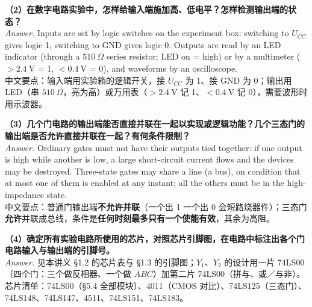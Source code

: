 \documentclass[11pt]{ctexart}
\let\origsubhdr\subhdr
\renewcommand{\subhdr}[1]{\needspace{3\baselineskip}\origsubhdr{#1}}
\begin{document}
\textbf{（2）在数字电路实验中，怎样给输入端施加高、低电平？怎样检测输出端的状态？}\\
\emph{Answer.} Inputs are set by logic switches on the experiment box: switching to $U_{CC}$ gives logic 1, switching to GND gives logic 0. Outputs are read by an LED indicator (through a $510\ \Omega$ series resistor; LED on = high) or by a multimeter ($>2.4\ \mathrm{V}$ = 1, $<0.4\ \mathrm{V}$ = 0), and waveforms by an oscilloscope.\\
中文要点：输入端用实验箱的逻辑开关，接 $U_{CC}$ 为 1、接 GND 为 0；输出用 LED（串 $510\ \Omega$，亮为高）或万用表（$>2.4\ \mathrm{V}$ 记 1、$<0.4\ \mathrm{V}$ 记 0），需要波形时用示波器。

\textbf{（3）几个门电路的输出端能否直接并联在一起以实现或逻辑功能？几个三态门的输出端是否允许直接并联在一起？有何条件限制？}\\
\emph{Answer.} Ordinary gates must not have their outputs tied together: if one output is high while another is low, a large short-circuit current flows and the devices may be destroyed. Three-state gates may share a line (a bus), on condition that at most one of them is enabled at any instant; all the others must be in the high-impedance state.\\
中文要点：普通门输出端\textbf{不允许并联}（一个出 1 一个出 0 会短路烧器件）；三态门\textbf{允许}并联成总线，条件是\textbf{任何时刻最多只有一个使能有效}，其余为高阻。

\textbf{（4）确定所有实验电路所使用的芯片，对照芯片引脚图，在电路中标注出各个门电路输入与输出端的引脚号。}\\
\emph{Answer.} 见本讲义 §1.2 的芯片表与 §1.3 的引脚图；$Y_1$、$Y_2$ 的设计用一片 74LS00（四个门：三个做反相器、一个做 $\overline{A}\overline{B}\overline{C}$）加第二片 74LS00（拼与、或／与非）。芯片清单：74LS00（§5.4 全部模块）、4011（CMOS 对比）、74LS125（三态门）、74LS148、74LS147、4511、74LS151、74LS183。

\end{document}
